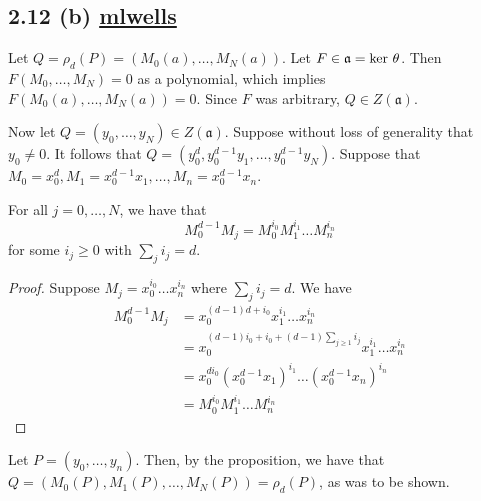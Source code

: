     \subsection*{2.12 (b)   \href{https://github.com/mikeleew}{mlwells}
}


Let $Q = \rho_d(P) = (M_0(a), \ldots, M_N(a))$.  Let $F \in \mathfrak{a} = \mbox{\rm ker }\theta$.  Then $F(M_0, \ldots, M_N) = 0$ as a polynomial, which implies $F(M_0(a), \ldots, M_N(a)) = 0$.  Since $F$ was arbitrary, $Q \in Z(\mathfrak{a})$. 

Now let $Q = (y_0, \ldots, y_N) \in Z(\mathfrak{a})$.  Suppose without loss of generality that $y_0 \neq 0$.  It follows that $Q = (y_0^d, y_0^{d-1} y_1, \ldots, y_0^{d-1} y_N)$.  Suppose that $M_0 = x_0^d, M_1 = x_0^{d-1} x_1, \ldots, M_n = x_0^{d-1} x_n$.
\setcounter{section}{1}
\setcounter{subsection}{2}
\begin{proposition}
	For all $j =0,\ldots, N$, we have that 
	\begin{equation}
		M_0^{d-1} M_j = M_0^{i_0} M_1^{i_1} \ldots M_n^{i_n} 
	\end{equation}
	for some $i_j \geq 0$ with $\sum_j i_j = d$.
\end{proposition}

\begin{proof}
Suppose $M_j = x_0^{i_0} \ldots x_n^{i_n}$ where $\sum_j i_j = d$.  We have
\begin{align}
M_0^{d-1} M_j &= x_0^{(d-1)d + i_0} x_1^{i_1} \ldots x_n^{i_n}\\
&= x_0^{(d-1)i_0 + i_0 + (d-1)\sum_{j \geq 1} i_j} x_1^{i_1} \ldots x_n^{i_n}\\
&= x_0^{d i_0} (x_0^{d-1} x_1)^{i_1} \ldots (x_0^{d-1} x_n)^{i_n}\\
&= M_0^{i_0} M_1^{i_1} \ldots M_n^{i_n}
\end{align}
\end{proof}

Let $P = (y_0, \ldots, y_n)$.  Then, by the proposition, we have that $Q = (M_0(P), M_1(P), \ldots, M_N(P)) = \rho_d(P)$, as was to be shown.